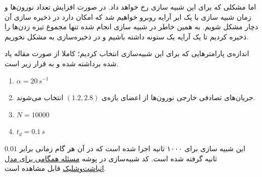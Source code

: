 اما مشکلی که برای این شبیه سازی رخ خواهد داد. در صورت افزایش تعداد نورون‌ها و زمان شبیه سازی با یک ابر آرایه روبرو خواهیم شد که امکان دارد در ذخیره سازی آن دچار مشکل شویم. به همین خاطر در شبیه سازی انجام شده تنها مجموع تیزه زدن‌ها را ذخیره کردیم تا یک آرایه یک ستونه داشته باشیم و در ذخیره‌سازی به مشکل نخوریم.

اندازه‌ی پارامتر‌هایی که برای این شبیه‌سازی انتخاب کردیم؛ کاملا از صورت مقاله یاد شده برداشته شده و به قرار زیر است.
\begin{tcolorbox}[colback=green!5!white,colframe=green!75!black]
	\begin{enumerate}[*]
		\item
		$\alpha = 20\, s^{-1}$
		\item
		جریان‌های تصادفی خارجی نورون‌ها از اعضای بازه‌ی $(1.2,2.8)$ انتخاب می‌شوند.
		\item
		$N = 10000$
		\item
		$t_d = 0.1\, s$ 
	\end{enumerate}
\end{tcolorbox}
این شبیه سازی برای ۱۰۰۰ ثانیه اجرا شده است که در آن هر گام زمانی برابر $0.01$ ثانیه گرفته شده است. کد شبیه‌سازی در پوشه 
\href{run://..//scripts//kuramoto_model_synchoronization_problem}{مسئله همگامی برای مدل انباشت‌و‌شلیک}
قابل مشاهده است.
